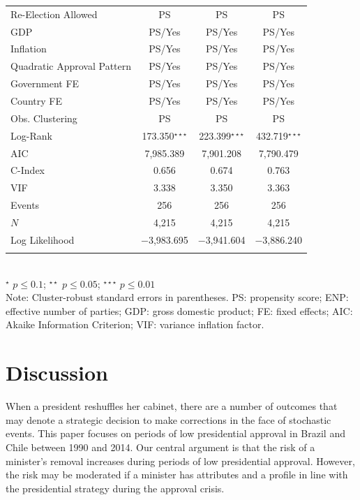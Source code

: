 \documentclass[12pt,halfline,a4paper]{ouparticle}
\begin{document}
\begin{table}[!htbp]
\begin{tabular}{@{\extracolsep{5pt}}lccc}
Re-Election Allowed & PS & PS & PS \\ 
GDP & PS/Yes & PS/Yes & PS/Yes \\ 
Inflation & PS/Yes & PS/Yes & PS/Yes \\ 
Quadratic Approval Pattern & PS/Yes & PS/Yes & PS/Yes \\ 
Government FE & PS/Yes & PS/Yes & PS/Yes \\ 
Country FE & PS/Yes & PS/Yes & PS/Yes \\ 
Obs. Clustering & PS & PS & PS \\ \midrule
Log-Rank & 173.350$^{\star\star\star}$ & 223.399$^{\star\star\star}$ & 432.719$^{\star\star\star}$ \\ 
AIC & 7,985.389 & 7,901.208 & 7,790.479 \\ 
C-Index & 0.656 & 0.674 & 0.763 \\ 
VIF & 3.338 & 3.350 & 3.363 \\ \midrule
Events & 256 & 256 & 256 \\ 
$N$ & 4,215 & 4,215 & 4,215 \\ 
Log Likelihood & $-$3,983.695 & $-$3,941.604 & $-$3,886.240 \\ 
\bottomrule \\[-1.8ex] 
\end{tabular} \\
{\footnotesize $^{\star}$ $p \leq 0.1$; $^{\star\star}$ $p \leq 0.05$; $^{\star\star\star}$ $p \leq 0.01$ \\
Note: Cluster-robust standard errors in parentheses. PS: propensity score; ENP: effective number of parties; GDP: gross domestic product; FE: fixed effects; AIC: Akaike Information Criterion; VIF: variance inflation factor.}
\end{table} 

\section{Discussion}
\label{sec5}

When a president reshuffles her cabinet, there are a number of outcomes that may denote a strategic decision to make corrections in the face of stochastic events. This paper focuses on periods of low presidential approval in Brazil and Chile between 1990 and 2014. Our central argument is that the risk of a minister’s removal increases during periods of low presidential approval. However, the risk may be moderated if a minister has attributes and a profile in line with the presidential strategy during the approval crisis. 
\end{document}
